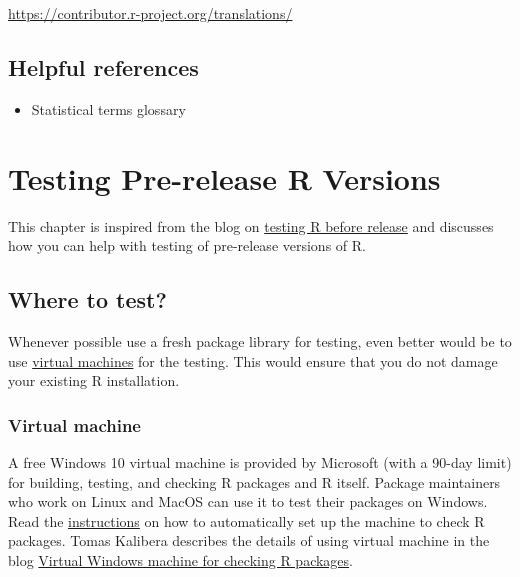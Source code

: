\documentclass[
]{book}
\providecommand{\tightlist}{%
  \setlength{\itemsep}{0pt}\setlength{\parskip}{0pt}}
\begin{document}
\url{https://contributor.r-project.org/translations/}

\hypertarget{helpful-references}{%
\section{Helpful references}\label{helpful-references}}

\begin{itemize}
\tightlist
\item
  Statistical terms glossary
\end{itemize}

\hypertarget{TestRVer}{%
\chapter{Testing Pre-release R Versions}\label{TestRVer}}

This chapter is inspired from the blog on \href{https://blog.r-project.org/2021/04/28/r-can-use-your-help-testing-r-before-release/index.html}{testing R before release} and discusses how you can help with testing of pre-release versions of R.

\hypertarget{where-to-test}{%
\section{Where to test?}\label{where-to-test}}

Whenever possible use a fresh package library for testing, even better would be to use \protect\hyperlink{VM}{virtual machines} for the testing. This would ensure that you do not damage your existing R installation.

\hypertarget{VM}{%
\subsection{Virtual machine}\label{VM}}

A free Windows 10 virtual machine is provided by Microsoft (with a 90-day limit) for building, testing, and checking R packages and R itself. Package maintainers who work on Linux and MacOS can use it to test their packages on Windows. Read the \href{https://svn.r-project.org/R-dev-web/trunk/WindowsBuilds/winutf8/ucrt3/vm.html}{instructions} on how to automatically set up the machine to check R packages. Tomas Kalibera describes the details of using virtual machine in the blog \href{https://blog.r-project.org/2021/03/18/virtual-windows-machine-for-checking-r-packages/index.html}{Virtual Windows machine for checking R packages}.
\end{document}
